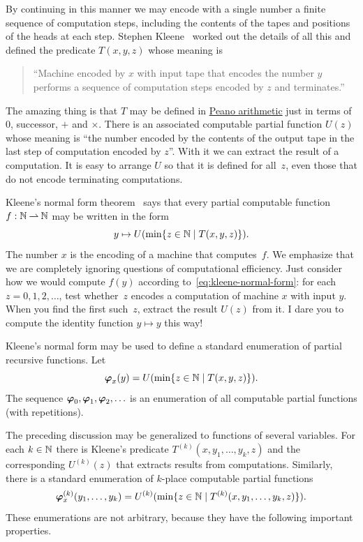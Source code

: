 By continuing in this manner we may encode with a single number a finite
sequence of computation steps, including the contents of the tapes
and positions of the heads at each step. Stephen Kleene~
worked out the details of all this and defined the predicate
$T(x,y,z)$ whose meaning is
%
\begin{quote}
  ``Machine encoded by $x$ with input tape that encodes the number $y$
  performs a sequence of computation steps encoded by $z$ and
  terminates.''
\end{quote}
%
The amazing thing is that $T$ may be defined in \href{https://en.wikipedia.org/wiki/Peano_axioms#Peano_arithmetic_as_first-order_theory}{Peano arithmetic} just
in terms of $0$, successor, $+$ and $\times$. There is an
associated computable partial function $U(z)$ whose meaning is ``the
number encoded by the contents of the output tape in the last step of
computation encoded by $z$''. With it we can extract the result of a computation. It is easy to arrange $U$ so that it is defined for all~$z$, even those that do not encode terminating computations.

Kleene's normal form theorem~
says that every partial computable function $f : \mathbb{N} \mathbin{\rightharpoonup} \mathbb{N}$ may
be written in the form
%
\begin{equation}
  \label{eq:kleene-normal-form}
  y \mapsto U(\min \{z \in \mathbb{N} \mid T(x,y,z)\}).
\end{equation}
%
The number $x$ is the encoding of a machine that computes~$f$. We
emphasize that we are completely ignoring questions of computational
efficiency. Just consider how we would compute $f(y)$ according
to~\eqref{eq:kleene-normal-form}: for each $z = 0, 1, 2, \ldots$, test
whether~$z$ encodes a computation of machine $x$ with input $y$. When
you find the first such~$z$, extract the result $U(z)$ from it. I dare
you to compute the identity function $y \mapsto y$ this way!

Kleene's normal form may be used to define a standard enumeration of
partial recursive functions. Let
%
\begin{equation*}
  \text{\boldmath{$\varphi$}}_{x}(y) = U(\min \{z \in \mathbb{N} \mid T(x,y,z)\}).
\end{equation*}
%
The sequence $\text{\boldmath{$\varphi$}}_0, \text{\boldmath{$\varphi$}}_1, \text{\boldmath{$\varphi$}}_2, \ldots$ is an enumeration of all
computable partial functions (with repetitions).

The preceding discussion may be generalized to functions of several
variables. For each $k \in \mathbb{N}$ there is Kleene's predicate
$T^{(k)}(x,y_1,\ldots,y_k,z)$ and the corresponding $U^{(k)}(z)$ that
extracts results from computations. Similarly, there is a standard
enumeration of $k$-place computable partial functions
%
\begin{equation*}
  \text{\boldmath{$\varphi$}}^{(k)}_{x}(y_1, \ldots, y_k) =
  U^{(k)}(\min \{z \in \mathbb{N} \mid T^{(k)}(x,y_1, \ldots, y_k,z)\}).
\end{equation*}
%
These enumerations are not arbitrary, because they have the following
important properties.

